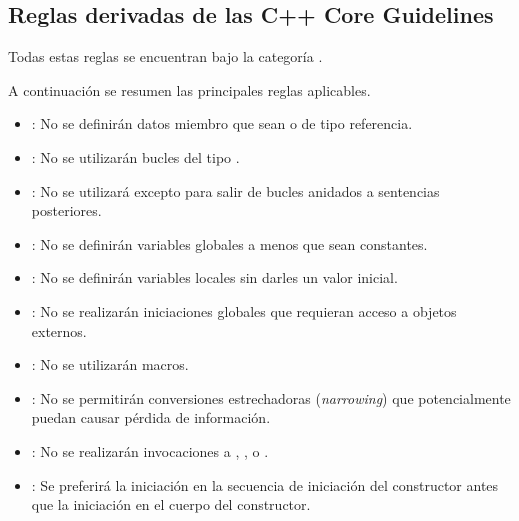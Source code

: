 \subsection{Reglas derivadas de las C++ Core Guidelines}

Todas estas reglas se encuentran bajo la categoría .

A continuación se resumen las principales reglas aplicables.

\begin{itemize}

\item {}:
No se definirán datos miembro que sean  o de tipo referencia.

\item {}:
No se utilizarán bucles del tipo .

\item {}:
No se utilizará  excepto para salir de bucles anidados
a sentencias posteriores.

\item {}:
No se definirán variables globales a menos que sean constantes.

\item {}:
No se definirán variables locales sin darles un valor inicial.

\item {}:
No se realizarán iniciaciones globales que requieran acceso a objetos externos.

\item {}:
No se utilizarán macros.

\item {}:
No se permitirán conversiones estrechadoras (\emph{narrowing}) que 
potencialmente puedan causar pérdida de información.

\item {}:
No se realizarán invocaciones a
, ,  o .

\item {}:
Se preferirá la iniciación en la secuencia de iniciación del constructor
antes que la iniciación en el cuerpo del constructor.

\end{itemize}

